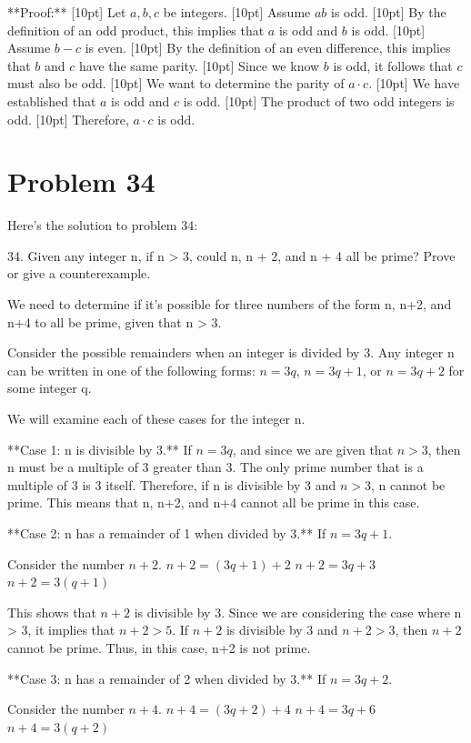 \documentclass{article}
\begin{document}
**Proof:**
[10pt]
Let $a, b, c$ be integers.
[10pt]
Assume $ab$ is odd.
[10pt]
By the definition of an odd product, this implies that $a$ is odd and $b$ is odd.
[10pt]
Assume $b - c$ is even.
[10pt]
By the definition of an even difference, this implies that $b$ and $c$ have the same parity.
[10pt]
Since we know $b$ is odd, it follows that $c$ must also be odd.
[10pt]
We want to determine the parity of $a \cdot c$.
[10pt]
We have established that $a$ is odd and $c$ is odd.
[10pt]
The product of two odd integers is odd.
[10pt]
Therefore, $a \cdot c$ is odd.

\newpage

\section*{Problem 34}
Here's the solution to problem 34:

34. Given any integer n, if n > 3, could n, n + 2, and n + 4 all be prime? Prove or give a counterexample.

We need to determine if it's possible for three numbers of the form n, n+2, and n+4 to all be prime, given that n > 3.

Consider the possible remainders when an integer is divided by 3. Any integer n can be written in one of the following forms:
$n = 3q$, $n = 3q + 1$, or $n = 3q + 2$ for some integer q.

We will examine each of these cases for the integer n.

**Case 1: n is divisible by 3.**
If $n = 3q$, and since we are given that $n > 3$, then n must be a multiple of 3 greater than 3. The only prime number that is a multiple of 3 is 3 itself. Therefore, if n is divisible by 3 and $n > 3$, n cannot be prime. This means that n, n+2, and n+4 cannot all be prime in this case.

**Case 2: n has a remainder of 1 when divided by 3.**
If $n = 3q + 1$.

Consider the number $n + 2$.
$n + 2 = (3q + 1) + 2$
$n + 2 = 3q + 3$
$n + 2 = 3(q + 1)$

This shows that $n + 2$ is divisible by 3.
Since we are considering the case where n > 3, it implies that $n+2 > 5$.
If $n+2$ is divisible by 3 and $n+2 > 3$, then $n+2$ cannot be prime.
Thus, in this case, n+2 is not prime.

**Case 3: n has a remainder of 2 when divided by 3.**
If $n = 3q + 2$.

Consider the number $n + 4$.
$n + 4 = (3q + 2) + 4$
$n + 4 = 3q + 6$
$n + 4 = 3(q + 2)$
\end{document}
